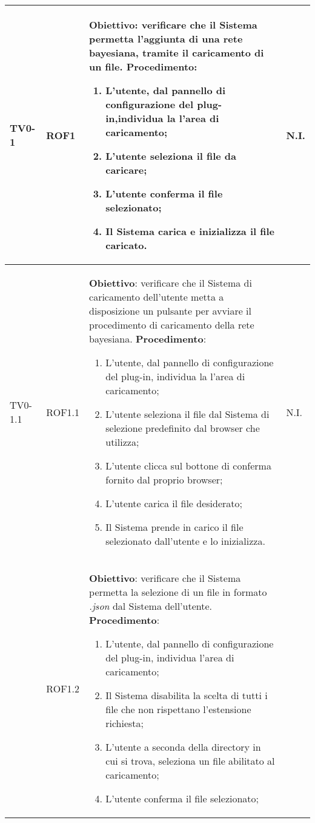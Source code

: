 \begin{longtable}{|C{.15\textwidth}|C{.13\textwidth}|m{.52\textwidth}|C{.08\textwidth}|}
TV0-1 & ROF1 &
	\textbf{Obiettivo}: verificare che il Sistema permetta l'aggiunta di una rete bayesiana, tramite il caricamento di un file. \newline
	\textbf{Procedimento}:
	\begin{enumerate}
		\item L'utente, dal pannello di configurazione del plug-in,individua la l'area di caricamento;
		\item L'utente seleziona il file da caricare;
		\item L'utente conferma il file selezionato;
		\item Il Sistema carica e inizializza il file caricato.
	\end{enumerate} & N.I. \\
\hline
{} TV0-1.1 & ROF1.1 &
	\textbf{Obiettivo}: verificare che il Sistema di caricamento dell'utente metta a disposizione un pulsante per avviare il procedimento di caricamento della rete bayesiana.
	\textbf{Procedimento}:
	\begin{enumerate}
		\item L'utente, dal pannello di configurazione del plug-in, individua la l'area di caricamento;
		\item L'utente seleziona il file dal Sistema di selezione predefinito dal browser che utilizza;
		\item L'utente clicca sul bottone di conferma fornito dal proprio browser;
		\item L'utente carica il file desiderato;
		\item Il Sistema prende in carico il file selezionato dall'utente e lo inizializza.
	\end{enumerate}
	& N.I. \\
\hline
{}   & ROF1.2 &
	\textbf{Obiettivo}: verificare che il Sistema permetta la selezione di un file in formato \textit{.json} dal Sistema dell'utente.\newline
	\textbf{Procedimento}:
	\begin{enumerate}
		\item L'utente, dal pannello di configurazione del plug-in, individua l'area di caricamento;
		\item Il Sistema disabilita la scelta di tutti i file che non rispettano l'estensione richiesta;
		\item L'utente a seconda della directory in cui si trova, seleziona un file abilitato al caricamento;
		\item L'utente conferma il file selezionato;

\end{enumerate}
\end{longtable}
